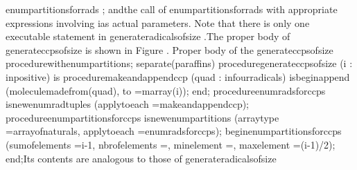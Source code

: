 \tyxffmxmono[]enum\Symuns[]partitions\Symuns[]for\Symuns[]rads%
\tyxffmxendmono[]; and\LstEnditem[]
\LstItem[]the call of \tyxffmxmono[]enum\Symuns[]partitions\Symuns[]for\Symuns[]rads%
\tyxffmxendmono[] with appropriate expressions involving %
\tyxffmxmono[]i\tyxffmxendmono[] as actual parameters.%
\LstEnditem[]
\LstEndlist[]
Note that there is only one executable statement in %
\tyxffmxmono[]generate\Symuns[]radicals\Symuns[]of\Symuns[]size%
\tyxffmxendmono[].\Endpara[]
\Para[]The proper body of \tyxffmxmono[]generate\Symuns[]ccps\Symuns[]of\Symuns[]size%
\tyxffmxendmono[] is shown in Figure .
\Parbox[]
Proper body of
the \tyxffmxmono[]generate\Symuns[]ccps\Symuns[]of\Symuns[]size%
\tyxffmxendmono[] procedure\FgEndcap[]
\Comp[]\tyxtstxbf[]with\tyxtstxendbf[] enum\Symuns[]partitions;
\tyxtstxbf[]separate\tyxtstxendbf[] (paraffins)
\tyxtstxbf[]procedure\tyxtstxendbf[] generate\Symuns[]ccps\Symuns[]of\Symuns[]size (i : %
\tyxtstxbf[]in\tyxtstxendbf[] positive) \tyxtstxbf[]is%
\tyxtstxendbf[]
   \tyxtstxbf[]procedure\tyxtstxendbf[] make\Symuns[]and\Symuns[]append\Symuns[]ccp (quad : %
\tyxtstxbf[]in\tyxtstxendbf[] four\Symuns[]radicals) %
\tyxtstxbf[]is\tyxtstxendbf[]
   \tyxtstxbf[]begin\tyxtstxendbf[]
      append (molecule\Symuns[]made\Symuns[]from(quad), to =\Symgt[] m\Symuns[]array(i));
   \tyxtstxbf[]end\tyxtstxendbf[];
   \tyxtstxbf[]procedure\tyxtstxendbf[] enum\Symuns[]rads\Symuns[]for\Symuns[]ccps %
\tyxtstxbf[]is\tyxtstxendbf[]
      \tyxtstxbf[]new\tyxtstxendbf[] enum\Symuns[]rad\Symuns[]tuples (apply\Symuns[]to\Symuns[]each =\Symgt[] make\Symuns[]and\Symuns[]append\Symuns[]ccp);
   \tyxtstxbf[]procedure\tyxtstxendbf[] enum\Symuns[]partitions\Symuns[]for\Symuns[]ccps %
\tyxtstxbf[]is\tyxtstxendbf[]
      \tyxtstxbf[]new\tyxtstxendbf[] enum\Symuns[]partitions (array\Symuns[]type    =\Symgt[] array\Symuns[]of\Symuns[]naturals,
                           apply\Symuns[]to\Symuns[]each =\Symgt[] enum\Symuns[]rads\Symuns[]for\Symuns[]ccps);
\tyxtstxbf[]begin\tyxtstxendbf[]
   enum\Symuns[]partitions\Symuns[]for\Symuns[]ccps (sum\Symuns[]of\Symuns[]elements =\Symgt[] i-1,
                             nbr\Symuns[]of\Symuns[]elements =,
                             min\Symuns[]element     =,
                             max\Symuns[]element     =\Symgt[] (i-1)/2);
\tyxtstxbf[]end\tyxtstxendbf[];\Endcomp[]
\EndParbox[]
\FgEndblock[]
 Its contents are analogous to those of \tyxffmxmono[]generate\Symuns[]radicals\Symuns[]of\Symuns[]size%
